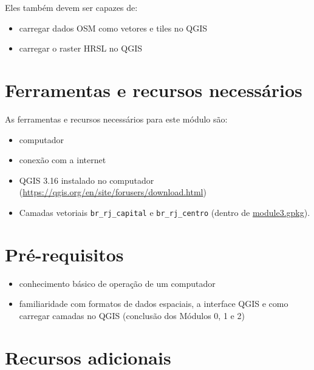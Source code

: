 \documentclass[
]{book}
\providecommand{\tightlist}{%
  \setlength{\itemsep}{0pt}\setlength{\parskip}{0pt}}
\begin{document}
Eles também devem ser capazes de:

\begin{itemize}
\tightlist
\item
  carregar dados OSM como vetores e tiles no QGIS
\item
  carregar o raster HRSL no QGIS
\end{itemize}

\hypertarget{ferramentas-e-recursos-necessuxe1rios-3}{%
\section{Ferramentas e recursos necessários}\label{ferramentas-e-recursos-necessuxe1rios-3}}

As ferramentas e recursos necessários para este módulo são:

\begin{itemize}
\tightlist
\item
  computador
\item
  conexão com a internet
\item
  QGIS 3.16 instalado no computador (\url{https://qgis.org/en/site/forusers/download.html})
\item
  Camadas vetoriais \texttt{br\_rj\_capital} e \texttt{br\_rj\_centro} (dentro de \url{module3.gpkg}).
\end{itemize}

\hypertarget{pruxe9-requisitos-3}{%
\section{Pré-requisitos}\label{pruxe9-requisitos-3}}

\begin{itemize}
\tightlist
\item
  conhecimento básico de operação de um computador
\item
  familiaridade com formatos de dados espaciais, a interface QGIS e como carregar camadas no QGIS (conclusão dos Módulos 0, 1 e 2)
\end{itemize}

\hypertarget{recursos-adicionais-3}{%
\section{Recursos adicionais}\label{recursos-adicionais-3}}
\end{document}
